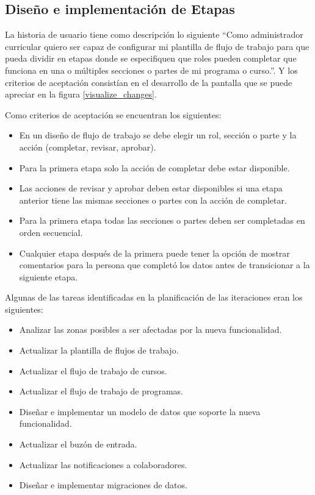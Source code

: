 \subsection{Diseño e implementación de Etapas}
La historia de usuario tiene como descripción lo siguiente \enquote{Como administrador curricular quiero ser capaz de configurar mi plantilla de flujo de trabajo para que pueda dividir en etapas donde se especifiquen que roles pueden completar que funciona en una o múltiples secciones o partes de mi programa o curso.}. Y los criterios de aceptación consistían en el desarrollo de la pantalla que se puede apreciar en la figura \ref{visualize_changes}.

Como criterios de aceptación se encuentran los siguientes:
\begin{itemize}
	\item En un diseño de flujo de trabajo se debe elegir un rol, sección o parte y la acción (completar, revisar, aprobar).
	\item Para la primera etapa solo la acción de completar debe estar disponible.
	\item Las acciones de revisar y aprobar deben estar disponibles si una etapa anterior tiene las mismas secciones o partes con la acción de completar.
	\item Para la primera etapa todas las secciones o partes deben ser completadas en orden secuencial.
	\item Cualquier etapa después de la primera puede tener la opción de mostrar comentarios para la persona que completó los datos antes de transicionar a la siguiente etapa.
\end{itemize}

Algunas de las tareas identificadas en la planificación de las iteraciones eran los siguientes:
\begin{itemize}
	\item Analizar las zonas posibles a ser afectadas por la nueva funcionalidad.
	\item Actualizar la plantilla de flujos de trabajo.
	\item Actualizar el flujo de trabajo de cursos.
	\item Actualizar el flujo de trabajo de programas.
	\item Diseñar e implementar un modelo de datos que soporte la nueva funcionalidad.
	\item Actualizar el buzón de entrada.
	\item Actualizar las notificaciones a colaboradores.
	\item Diseñar e implementar migraciones de datos.
\end{itemize}

